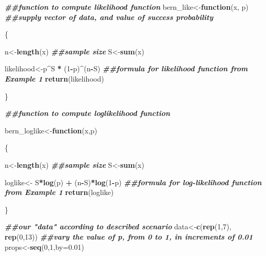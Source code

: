 \documentclass[
]{book}
\newenvironment{Shaded}{\begin{snugshade}}{\end{snugshade}}
\newcommand{\AttributeTok}[1]{\textcolor[rgb]{0.13,0.29,0.53}{#1}}
\newcommand{\ControlFlowTok}[1]{\textcolor[rgb]{0.13,0.29,0.53}{\textbf{#1}}}
\newcommand{\DecValTok}[1]{\textcolor[rgb]{0.00,0.00,0.81}{#1}}
\newcommand{\DocumentationTok}[1]{\textcolor[rgb]{0.56,0.35,0.01}{\textbf{\textit{#1}}}}
\newcommand{\FloatTok}[1]{\textcolor[rgb]{0.00,0.00,0.81}{#1}}
\newcommand{\FunctionTok}[1]{\textcolor[rgb]{0.13,0.29,0.53}{\textbf{#1}}}
\newcommand{\NormalTok}[1]{#1}
\newcommand{\OtherTok}[1]{\textcolor[rgb]{0.56,0.35,0.01}{#1}}
\newcommand{\SpecialCharTok}[1]{\textcolor[rgb]{0.81,0.36,0.00}{\textbf{#1}}}
\begin{document}
\begin{Shaded}
\begin{Highlighting}[]
\DocumentationTok{\#\#function to compute likelihood function }
\NormalTok{bern\_like}\OtherTok{\textless{}{-}}\ControlFlowTok{function}\NormalTok{(x, p) }\DocumentationTok{\#\#supply vector of data, and value of success probability}
  
\NormalTok{\{}
  
\NormalTok{  n}\OtherTok{\textless{}{-}}\FunctionTok{length}\NormalTok{(x) }\DocumentationTok{\#\#sample size}
\NormalTok{  S}\OtherTok{\textless{}{-}}\FunctionTok{sum}\NormalTok{(x) }
  
\NormalTok{  likelihood}\OtherTok{\textless{}{-}}\NormalTok{p}\SpecialCharTok{\^{}}\NormalTok{S }\SpecialCharTok{*}\NormalTok{ (}\DecValTok{1}\SpecialCharTok{{-}}\NormalTok{p)}\SpecialCharTok{\^{}}\NormalTok{(n}\SpecialCharTok{{-}}\NormalTok{S) }\DocumentationTok{\#\#formula for likelihood function from Example 1}
  \FunctionTok{return}\NormalTok{(likelihood)}
  
\NormalTok{\}}

\DocumentationTok{\#\#function to compute loglikelihood function}

\NormalTok{bern\_loglike}\OtherTok{\textless{}{-}}\ControlFlowTok{function}\NormalTok{(x,p)}
  
\NormalTok{\{}
  
\NormalTok{  n}\OtherTok{\textless{}{-}}\FunctionTok{length}\NormalTok{(x) }\DocumentationTok{\#\#sample size}
\NormalTok{  S}\OtherTok{\textless{}{-}}\FunctionTok{sum}\NormalTok{(x) }
  
\NormalTok{  loglike}\OtherTok{\textless{}{-}}\NormalTok{ S}\SpecialCharTok{*}\FunctionTok{log}\NormalTok{(p) }\SpecialCharTok{+}\NormalTok{ (n}\SpecialCharTok{{-}}\NormalTok{S)}\SpecialCharTok{*}\FunctionTok{log}\NormalTok{(}\DecValTok{1}\SpecialCharTok{{-}}\NormalTok{p) }\DocumentationTok{\#\#formula for log{-}likelihood function from Example 1}
  \FunctionTok{return}\NormalTok{(loglike) }
  
\NormalTok{\}}

\DocumentationTok{\#\#our "data" according to described scenario}
\NormalTok{data}\OtherTok{\textless{}{-}}\FunctionTok{c}\NormalTok{(}\FunctionTok{rep}\NormalTok{(}\DecValTok{1}\NormalTok{,}\DecValTok{7}\NormalTok{), }\FunctionTok{rep}\NormalTok{(}\DecValTok{0}\NormalTok{,}\DecValTok{13}\NormalTok{)) }
\DocumentationTok{\#\#vary the value of p, from 0 to 1, in increments of 0.01}
\NormalTok{props}\OtherTok{\textless{}{-}}\FunctionTok{seq}\NormalTok{(}\DecValTok{0}\NormalTok{,}\DecValTok{1}\NormalTok{,}\AttributeTok{by=}\FloatTok{0.01}\NormalTok{) }


\end{Highlighting}
\end{Shaded}
\end{document}
